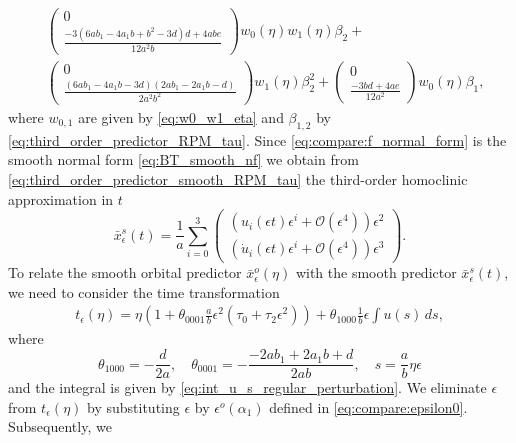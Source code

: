 \begin{equation*}
\begin{aligned}
        & \begin{pmatrix} 0 \\ \frac{-3 (6 a b_1 - 4 a_1 b + b^2 - 3 d) d + 4 a b e}{12 a^2 b} \end{pmatrix} w_0(\eta) w_1(\eta) \beta_2 + \\
        & \begin{pmatrix} 0 \\ \frac{(6 a b_1 - 4 a_1 b - 3 d) (2 a b_1 - 2 a_1 b - d)}{2 a^2 b^2} \end{pmatrix} w_1(\eta) \beta_2^2 + 
          \begin{pmatrix} 0 \\ \frac{-3 b d + 4 a e}{12 a^2} \end{pmatrix} w_0(\eta) \beta_1,
\end{aligned}
\end{equation*}
where $w_{0,1}$ are given by \cref{eq:w0_w1_eta} and $\beta_{1,2}$ by
\cref{eq:third_order_predictor_RPM_tau}.
Since \cref{eq:compare:f_normal_form} is the smooth normal form
\cref{eq:BT_smooth_nf} we obtain from
\cref{eq:third_order_predictor_smooth_RPM_tau} the third-order homoclinic
approximation in $t$
\begin{equation*}
\bar x_\epsilon^s(t) =  \frac1{a} \sum_{i=0}^3
\begin{pmatrix}
 \left(      u_i(\epsilon t) \epsilon^i + \mathcal{O}(\epsilon^4) \right) \epsilon^2 \\
 \left( \dot u_i(\epsilon t) \epsilon^i + \mathcal{O}(\epsilon^4) \right) \epsilon^3
\end{pmatrix}.
\end{equation*}
To relate the smooth orbital predictor $\bar x_\epsilon^o(\eta)$ with the smooth
predictor $\bar x_\epsilon^s(t)$, we need to consider the time transformation
\begin{equation*}
\begin{aligned}
    t_\epsilon(\eta) = \eta \left( 1 + \theta_{0001}\frac{a}{b}\epsilon^2\left(\tau_0 + \tau_2 \epsilon^2 \right) \right) + 
        \theta_{1000} \frac{1}{b} \epsilon \int u(s) \, ds,
\end{aligned}
\end{equation*}
where
\[
    \theta_{1000} = -\frac{d}{2 a}, 
    \quad \theta_{0001} = -\frac{-2 a b_1 + 2 a_1 b + d}{2 a b}, 
    \quad s = \frac{a}{b} \eta \epsilon
\] 
and the integral is given by \cref{eq:int_u_s_regular_perturbation}. We
eliminate $\epsilon$ from $t_\epsilon(\eta)$ by substituting $\epsilon$ by
$\epsilon^o(\alpha_1)$ defined in \cref{eq:compare:epsilon0}. Subsequently, we
